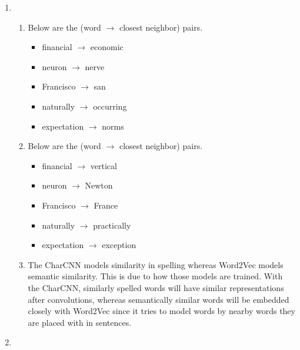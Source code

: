 \documentclass[12pt]{article}
\begin{document}
\begin{enumerate}[label=\textbf{\arabic*.}]
\begin{enumerate}[label=(\alph*)]
    \item
    \begin{enumerate}[label=\roman*.]
      \item Below are the (word $\rightarrow$ closest neighbor) pairs.
        \begin{itemize}
          \item financial $\rightarrow$ economic
          \item neuron $\rightarrow$ nerve
          \item Francisco $\rightarrow$ san
          \item naturally $\rightarrow$ occurring
          \item expectation $\rightarrow$ norms
        \end{itemize}
      \item Below are the (word $\rightarrow$ closest neighbor) pairs.
        \begin{itemize}
          \item financial $\rightarrow$ vertical
          \item neuron $\rightarrow$ Newton
          \item Francisco $\rightarrow$ France
          \item naturally $\rightarrow$ practically
          \item expectation $\rightarrow$ exception
        \end{itemize}
      \item The CharCNN models similarity in spelling whereas Word2Vec models semantic similarity. This is due to how those models are trained. With the CharCNN, similarly spelled words will have similar representations after convolutions, whereas semantically similar words will be embedded closely with Word2Vec since it tries to model words by nearby words they are placed with in sentences.
    \end{enumerate}
    \item
  \end{enumerate}
\end{enumerate}
\end{document}
